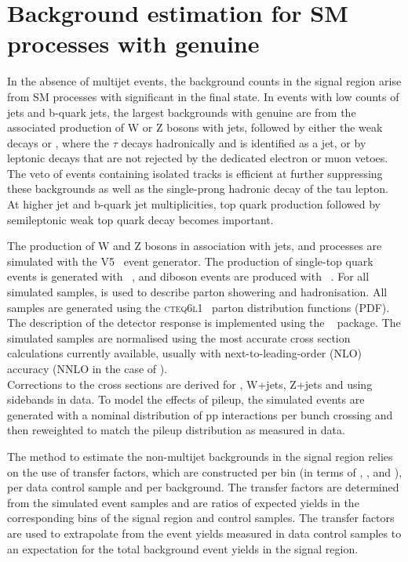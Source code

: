 \section{Background estimation for SM processes with genuine \ETmiss}
\label{sec:ewk_background}

In the absence of multijet events, the background counts in the signal
region arise from SM processes with significant \ETmiss in the final
state. In events with low counts of jets and b-quark jets, the largest
backgrounds with genuine \ETmiss are from the associated production of
W or Z bosons with jets, followed by either the weak decays \znunu or
\wtaunu, where the $\tau$ decays hadronically and is identified as a
jet, or by leptonic decays that are not rejected by the dedicated
electron or muon vetoes. The veto of events containing isolated tracks
is efficient at further suppressing these backgrounds as well as the
single-prong hadronic decay of the tau lepton. At higher jet and
b-quark jet multiplicities, top quark production followed by
semileptonic weak top quark decay becomes important.

The production of W and Z bosons in association with jets, \ttbar and
\gj processes are simulated with the \MADGRAPH V5~\cite{madgraph}
event generator. The production of single-top quark events is
generated with \POWHEG~\cite{powheg}, and diboson events are produced
with ~\cite{pythia8}. For all simulated samples, 
is used to describe parton showering and hadronisation. All samples
are generated using the \textsc{cteq6l1}~\cite{Pumplin:2002vw} parton
distribution functions (PDF). The description of the detector response
is implemented using the \GEANTfour~\cite{geant} package. The
simulated samples are normalised using the most accurate cross section
calculations currently available, usually with
next-to-leading-order (NLO) accuracy (NNLO in the case of \ttbar). \\
Corrections to the cross sections are derived for \gj, W+jets, Z+jets and \ttbar 
using sidebands in data.
To model the effects of pileup, the simulated events are generated with a nominal distribution
of pp interactions per bunch crossing and then reweighted to match the
pileup distribution as measured in data.

The method to estimate the non-multijet backgrounds in the signal
region relies on the use of transfer factors, which are constructed
per bin (in terms of \njet, \nb, and \scalht), per data control
sample and per background. The transfer factors are determined from the simulated event
samples and are ratios of expected yields in the corresponding bins of
the signal region and control samples. The transfer factors are used
to extrapolate from the event yields measured in data control samples
to an expectation for the total background event yields in the signal
region.

